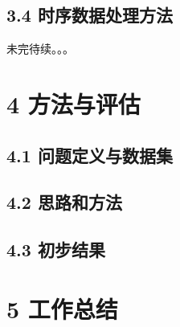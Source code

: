 \documentclass[a4paper,UTF8]{article}
\begin{document}
\subsection*{3.4 时序数据处理方法}

未完待续。。。


\section*{4 方法与评估}

\subsection*{4.1 问题定义与数据集}

\subsection*{4.2 思路和方法}

\subsection*{4.3 初步结果}



\section*{5 工作总结}
















\end{document}
